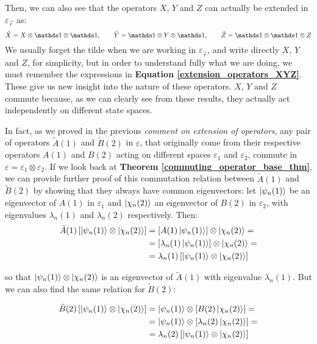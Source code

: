 Then, we can also see that the operators $X$, $Y$ and $Z$ can actually be extended in $\varepsilon_{\vec{r}}$ as:
\begin{equation} \label{extension_operators_XYZ}
    \tilde X = X\otimes\Imat\otimes\Imat, \qquad \tilde Y = \Imat\otimes Y\otimes\Imat, \qquad \tilde Z = \Imat\otimes\Imat\otimes Z
\end{equation}
We usually forget the tilde when we are working in $\varepsilon_{\vec{r}}$, and write directly $X$, $Y$ and $Z$, for simplicity, but in order to understand fully what we are doing, we must remember the expressions in \textbf{Equation \ref{extension_operators_XYZ}}. These give us new insight into the nature of these operators. $X$, $Y$ and $Z$ commute because, as we can clearly see from these results, they actually act independently on different state spaces.

In fact, as we proved in the previous \textit{comment on extension of operators}, any pair of operators $\tilde A(1)$ and $\tilde B(2)$ in $\varepsilon$, that originally come from their respective operators $A(1)$ and $B(2)$ acting on different spaces $\varepsilon_1$ and $\varepsilon_2$, commute in $\varepsilon = \varepsilon_1\otimes \varepsilon_2$. If we look back at \textbf{Theorem \ref{commuting_operator_base_thm}}, we can provide further proof of this commutation relation between $\tilde A(1)$ and $\tilde B(2)$ by showing that they always have common eigenvectors: let $\ket{\psi_n(1)}$ be an eigenvector of $A(1)$ in $\varepsilon_1$ and $\ket{\chi_n(2)}$ an eigenvector of $B(2)$ in $\varepsilon_2$, with eigenvalues $\lambda_n(1)$ and $\lambda_n(2)$ respectively. Then:
\begin{equation}
    \begin{split}
        \tilde A(1)\left[\ket{\psi_n(1)}\otimes\ket{\chi_n(2)}\right] &= \left[A(1)\ket{\psi_n(1)}\right]\otimes\ket{\chi_n(2)} =\\
        &= \left[\lambda_n(1)\ket{\psi_n(1)}\right]\otimes\ket{\chi_n(2)} = \\
        &= \lambda_n(1)\left[\ket{\psi_n(1)}\otimes\ket{\chi_n(2)}\right]
    \end{split}
\end{equation}

so that $\ket{\psi_n(1)}\otimes\ket{\chi_n(2)}$ is an eigenvector of $\tilde A(1)$ with eigenvalue $\lambda_n(1)$. But we can also find the same relation for $\tilde B(2)$:

\begin{equation}
    \begin{split}
        \tilde B(2)\left[\ket{\psi_n(1)}\otimes\ket{\chi_n(2)}\right] &= \ket{\psi_n(1)}\otimes\left[B(2)\ket{\chi_n(2)}\right] =\\
        &= \ket{\psi_n(1)}\otimes\left[\lambda_n(2)\ket{\chi_n(2)}\right] = \\
        &= \lambda_n(2)\left[\ket{\psi_n(1)}\otimes\ket{\chi_n(2)}\right]
    \end{split}
\end{equation}

